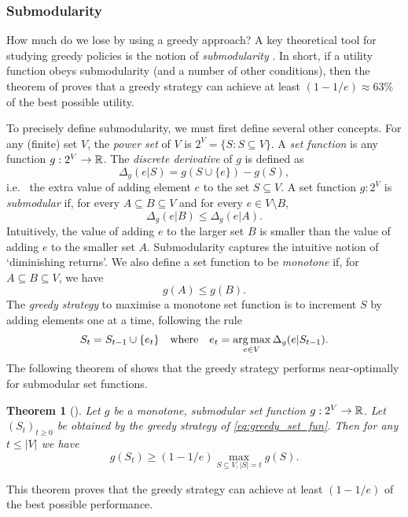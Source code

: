 \documentclass[a4paper, 10pt]{report}
\theoremstyle{plain}
\newtheorem{theorem}{Theorem}[chapter]
\begin{document}
	\subsubsection{Submodularity}
	\label{sec:submodular}
	How much do we lose by using a greedy approach?
	A key theoretical tool for studying greedy policies is the notion of \emph{submodularity} \citep{krause2014submodular}.
	In short, if a utility function obeys submodularity (and a number of other conditions), then the theorem of \citet{nemhauser1978analysis} proves that a greedy strategy can achieve at least $(1 - 1/e) \approx 63\%$ of the best possible utility.
	
	To precisely define submodularity, we must first define several other concepts.
	For any (finite) set $V$, the \emph{power set} of $V$ is $2^V = \{ S: S \subseteq V \}$.
	A \emph{set function} is any function $g: 2^V \to {\mathbb{R}}$.
	The \emph{discrete derivative} of $g$ is defined as 
	\begin{equation}
	\Delta_g (e | S)  = g( S \cup \{ e \}) - g(S),
	\end{equation}
	i.e.~ the extra value of adding element $e$ to the set $S \subseteq V$.
	A set function $g: 2^V $ is \emph{submodular} if, for every $A \subseteq B \subseteq V$ and for every $e \in V \setminus B$,
	\begin{equation}
	\Delta_g(e|B) \le \Delta_g(e|A).
	\end{equation}
	Intuitively, the value of adding $e$ to the larger set $B$ is smaller than the value of adding $e$ to the smaller set $A$.
	Submodularity captures the intuitive notion of `diminishing returns'.
	We also define a set function to be \emph{monotone} if, for $A \subseteq B \subseteq V$, we have
	\begin{equation}
	g(A) \le g(B).
	\end{equation}
	The \emph{greedy strategy} to maximise a monotone set function is to increment $S$ by adding elements one at a time, following the rule
	\begin{equation}
	\label{eq:greedy_set_fun}
	S_t = S_{t-1} \cup \{ e_t \} \quad\text{where}\quad e_t = \operatorname*{arg\,max}_{e\in V } \Delta_g(e|S_{t-1}).
	\end{equation}
	The following theorem of \citet{nemhauser1978analysis} shows that the greedy strategy performs near-optimally for submodular set functions.
	\begin{theorem}[\citet{nemhauser1978analysis}] \label{thm:submodular}
		Let $g$ be a monotone, submodular set function $g : 2^V \to {\mathbb{R}}$.
		Let $(S_t)_{t\ge 0}$ be obtained by the greedy strategy of \eqref{eq:greedy_set_fun}.
		Then for any $t\le |V|$ we have
		\begin{equation}
		g(S_t) \ge \left(1 - 1/e\right) \max_{S \subseteq V, |S| = t} g(S).
		\end{equation}
	\end{theorem}
	This theorem proves that the greedy strategy can achieve at least $(1 - 1/e)$ of the best possible performance.
	
\end{document}
